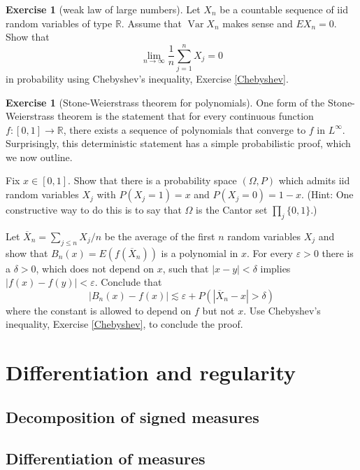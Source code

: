 \documentclass[12pt]{book}
\newcommand{\RR}{\mathbb{R}}
\DeclareMathOperator{\Var}{Var}
\theoremstyle{definition}
\newtheorem{exercise}[theorem]{Exercise}
\begin{document}
\begin{exercise}[weak law of large numbers]
Let $X_n$ be a countable sequence of iid random variables of type $\RR$.
Assume that $\Var X_n$ makes sense and $EX_n = 0$. Show that
$$\lim_{n \to \infty} \frac{1}{n} \sum_{j=1}^n X_j = 0$$
in probability using Chebyshev's inequality, Exercise \ref{Chebyshev}.
\end{exercise}

\begin{exercise}[Stone-Weierstrass theorem for polynomials]
One form of the Stone-Weierstrass theorem is the statement that for every continuous function $f: [0, 1] \to \RR$, there exists a sequence of polynomials that converge to $f$ in $L^\infty$.
Surprisingly, this deterministic statement has a simple probabilistic proof, which we now outline.

Fix $x \in [0, 1]$.
Show that there is a probability space $(\Omega, P)$ which admits iid random variables $X_j$ with $P(X_j = 1) = x$ and $P(X_j = 0) = 1 - x$.
(Hint: One constructive way to do this is to say that $\Omega$ is the Cantor set $\prod_j \{0, 1\}$.)

Let $\overline X_n = \sum_{j \leq n} X_j/n$ be the average of the first $n$ random variables $X_j$ and show that $B_n(x) = E(f(\overline X_n))$ is a polynomial in $x$.
For every $\varepsilon > 0$ there is a $\delta > 0$, which does not depend on $x$, such that $|x - y| < \delta$ implies $|f(x) - f(y)| < \varepsilon$.
Conclude that
$$|B_n(x) - f(x)| \lesssim \varepsilon + P(|\overline X_n - x| > \delta)$$
where the constant is allowed to depend on $f$ but not $x$.
Use Chebyshev's inequality, Exercise \ref{Chebyshev}, to conclude the proof.
\end{exercise}

\chapter{Differentiation and regularity}

\section{Decomposition of signed measures}

\section{Differentiation of measures}
\end{document}
